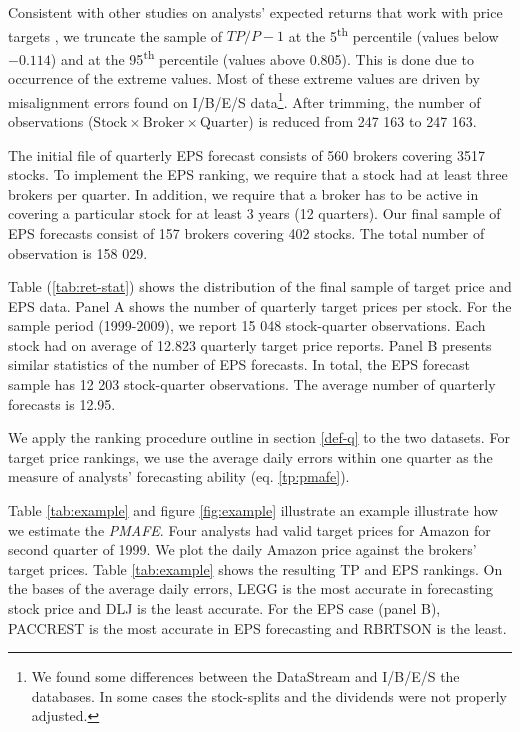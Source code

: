 \documentclass{article}\usepackage[]{graphicx}\usepackage[]{color}
\begin{document}
Consistent with other studies on analysts' expected returns that work with price targets  \citep{bradshaw2002,brav2003,da2011}, we truncate the sample of $TP/P-1$ at the 5\textsuperscript{th} percentile (values below \ensuremath{-0.114}) and at the 95\textsuperscript{th} percentile (values above 0.805). This is done due to occurrence of the extreme values. Most of these extreme values are driven by misalignment errors found on I/B/E/S data\footnote{We found some differences between the  DataStream and I/B/E/S the databases. In some cases the stock-splits and the dividends were not properly adjusted.}. After trimming, the number of observations ($\mathrm{Stock} \times \mathrm{Broker} \times  \mathrm{Quarter}$) is reduced  from 247 163 to 247 163.

The initial file of quarterly EPS forecast consists of  560 brokers covering 3517 stocks. To implement the EPS ranking, we require that a stock had at least three brokers per quarter. In addition, we require that a broker has to be active in covering a particular stock for at least 3 years (12 quarters). Our final sample of EPS forecasts consist of  157 brokers covering 402 stocks. The total number of observation is 158 029.
 

Table (\ref{tab:ret-stat}) shows the distribution of the final sample of target price and EPS data. Panel A shows the number of quarterly target prices per stock. For the sample period (1999-2009), we report 15 048 stock-quarter observations. Each stock had on average of 12.823 quarterly target price reports. Panel B  presents similar statistics of the number of EPS forecasts. In total, the EPS forecast sample has 12 203 stock-quarter observations. The average number of quarterly forecasts is 12.95.

We apply the ranking procedure outline in section \ref{def-q} to the two datasets. For target price rankings, we use the average daily errors within one quarter as the measure of analysts' forecasting ability (eq. \ref{tp:pmafe}). 

Table \ref{tab:example} and figure \ref{fig:example} illustrate an example illustrate how we estimate the \textit{PMAFE}. Four analysts had valid target prices for Amazon for second quarter of 1999. We plot the daily Amazon price against the brokers' target prices. Table \ref{tab:example} shows the resulting TP and EPS rankings. On the bases of the average daily errors, LEGG is the most accurate in forecasting stock price and  DLJ is the least accurate. For the EPS case (panel B), PACCREST is the most accurate in EPS forecasting and RBRTSON is the least. 
\end{document}
